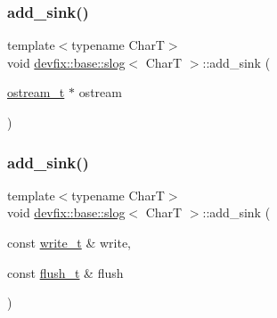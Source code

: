 \subsubsection{\texorpdfstring{add\+\_\+sink()}{add\_sink()}\hspace{0.1cm}{\footnotesize\ttfamily [2/3]}}
{\footnotesize\ttfamily template$<$typename CharT$>$ \\
void \hyperlink{structdevfix_1_1base_1_1slog}{devfix\+::base\+::slog}$<$ CharT $>$\+::add\+\_\+sink (\begin{DoxyParamCaption}\item[{\hyperlink{structdevfix_1_1base_1_1slog_a3602226e6adc9ea19626e25a0df085a6}{ostream\+\_\+t} $\ast$}]{ostream }\end{DoxyParamCaption})\hspace{0.3cm}{\ttfamily [inline]}}

\mbox{\label{structdevfix_1_1base_1_1slog_a60153602299e16dca17dadc19f218814}} 
\subsubsection{\texorpdfstring{add\+\_\+sink()}{add\_sink()}\hspace{0.1cm}{\footnotesize\ttfamily [3/3]}}
{\footnotesize\ttfamily template$<$typename CharT$>$ \\
void \hyperlink{structdevfix_1_1base_1_1slog}{devfix\+::base\+::slog}$<$ CharT $>$\+::add\+\_\+sink (\begin{DoxyParamCaption}\item[{const \hyperlink{structdevfix_1_1base_1_1slog_a5897ebe6b65ffd7a1845a6bca989f288}{write\+\_\+t} \&}]{write,  }\item[{const \hyperlink{structdevfix_1_1base_1_1slog_a5c957ca5d7392786ede9f813ec40fb40}{flush\+\_\+t} \&}]{flush }\end{DoxyParamCaption})\hspace{0.3cm}{\ttfamily [inline]}}

\mbox{\label{structdevfix_1_1base_1_1slog_ac4610846d3f7b2dfa506ea6e1a9b1826}} 
